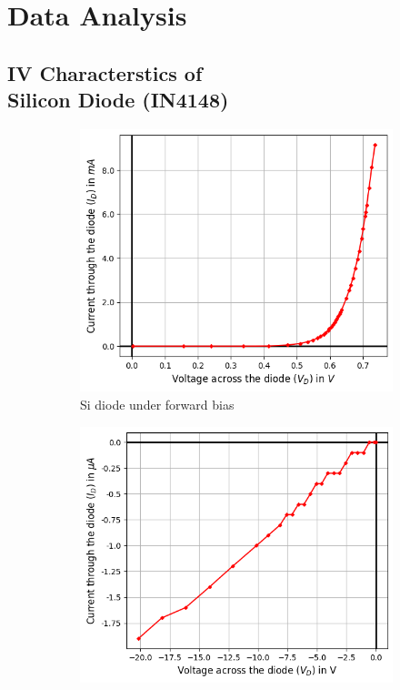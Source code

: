 \section{Data Analysis}

\subsection{IV Characterstics of\\Silicon Diode (IN4148)}

    \begin{figure}[H]
     \centering
     \begin{subfigure}[b]{0.45\textwidth}
         \centering
         \includegraphics[width=\textwidth]{images/1.png}
         \caption{Si diode under forward bias}
         \label{fig1}
     \end{subfigure}
     \hfill
     \begin{subfigure}[b]{0.45\textwidth}
         \centering
         \includegraphics[width=\textwidth]{images/2.png}

\end{subfigure}
\end{figure}
